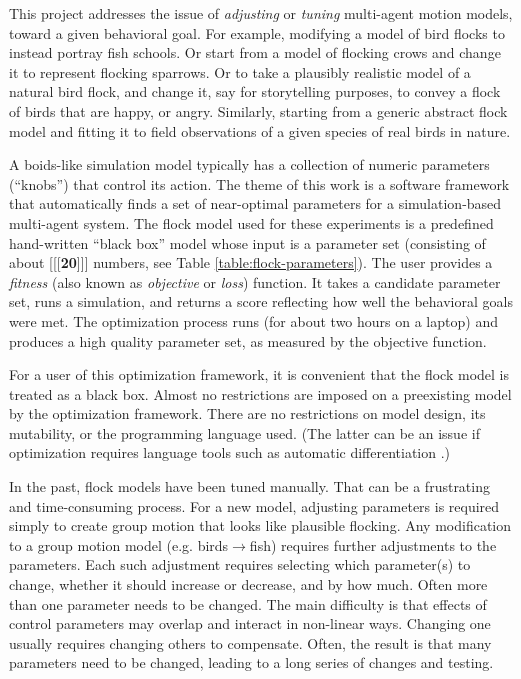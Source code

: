 \documentclass[letterpaper]{article}
\begin{document}
This project addresses the issue of \textit{adjusting} or \textit{tuning} multi-agent motion models, toward a given behavioral goal. For example, modifying a model of bird flocks to instead portray fish schools. Or start from a model of flocking crows and change it to represent flocking sparrows. Or to take a plausibly realistic model of a natural bird flock, and change it, say for storytelling purposes, to convey a flock of birds that are happy, or angry. Similarly, starting from a generic abstract flock model and fitting it to field observations of a given species of real birds in nature.

A boids-like simulation model typically has a collection of numeric parameters (``knobs'') that control its action. The theme of this work is a software framework that automatically finds a set of near-optimal parameters for a simulation-based multi-agent system. The flock model used for these experiments is a predefined hand-written ``black box'' model whose input is a parameter set (consisting of about [[[\textbf{20}]]] numbers, see Table \ref{table:flock-parameters}). The user provides a \textit{fitness} (also known as \textit{objective} or \textit{loss}) function. It takes a candidate parameter set, runs a simulation, and returns a score reflecting how well the behavioral goals were met. The optimization process runs (for about two hours on a laptop) and produces a high quality parameter set, as measured by the objective function.

For a user of this optimization framework, it is convenient that the flock model is treated as a black box. Almost no restrictions are imposed on a preexisting model by the optimization framework. There are no restrictions on model design, its mutability, or the programming language used. (The latter can be an issue if optimization requires language tools such as automatic differentiation \citep{baydin_automatic_2018}.)

In the past, flock models have been tuned manually. That can be a frustrating and time-consuming process. For a new model, adjusting parameters is required simply to create group motion that looks like plausible flocking. Any modification to a group motion model (e.g. birds{$\rightarrow$}fish) requires further adjustments to the parameters. Each such adjustment requires selecting which parameter(s) to change, whether it should increase or decrease, and by how much. Often more than one parameter needs to be changed. The main difficulty is that effects of control parameters may overlap and interact in non-linear ways. Changing one usually requires changing others to compensate. Often, the result is that many parameters need to be changed, leading to a long series of changes and testing.
\end{document}
